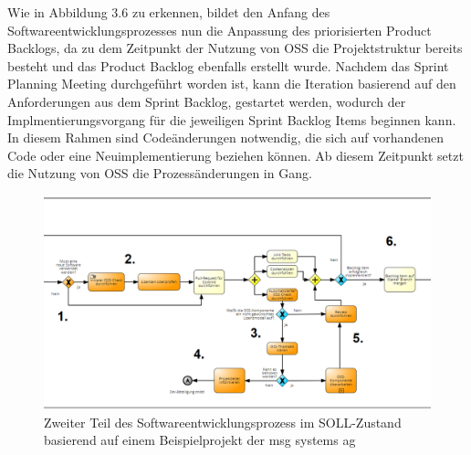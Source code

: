 Wie in Abbildung 3.6 zu erkennen, bildet den Anfang des Softwareentwicklungsprozesses nun die Anpassung des priorisierten Product Backlogs, da zu dem Zeitpunkt der Nutzung von OSS die Projektstruktur bereits besteht und das Product Backlog ebenfalls erstellt wurde. Nachdem das Sprint Planning Meeting durchgeführt worden ist, kann die Iteration basierend auf den Anforderungen aus dem Sprint Backlog, gestartet werden, wodurch der Implmentierungsvorgang für die jeweiligen Sprint Backlog Items beginnen kann. In diesem Rahmen sind Codeänderungen notwendig, die sich auf vorhandenen Code oder eine Neuimplementierung beziehen können. Ab diesem Zeitpunkt setzt die Nutzung von OSS die Prozessänderungen in Gang.

\begin{figure}[h]
    \centering
    \includegraphics[scale=0.5]{Bilder/SOLL-Prozess_second Partv2.png}
    \caption{Zweiter Teil des Softwareentwicklungsprozess im SOLL-Zustand basierend auf einem Beispielprojekt der msg systems ag}
\end{figure}

